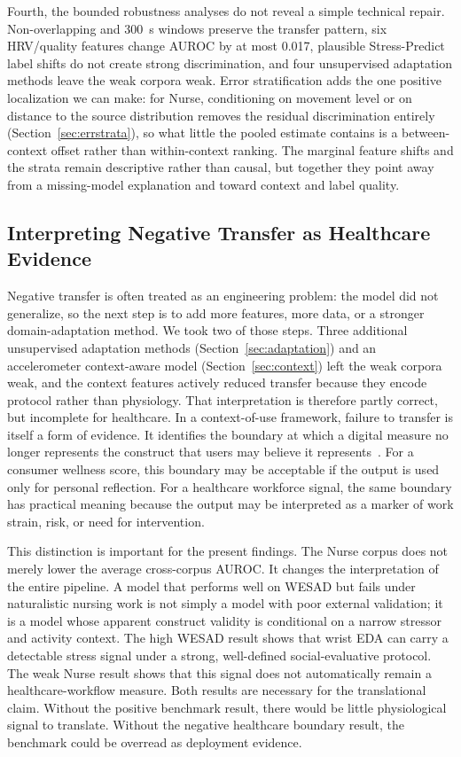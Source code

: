 \documentclass[healthcare,article,submit,moreauthors,pdftex]{Definitions/mdpi}
\begin{document}
Fourth, the bounded robustness analyses do not reveal a simple technical repair.
Non-overlapping and 300~s windows preserve the transfer pattern, six HRV/quality
features change AUROC by at most 0.017, plausible Stress-Predict label shifts do
not create strong discrimination, and four unsupervised adaptation methods leave
the weak corpora weak. Error stratification adds the one positive localization we
can make: for Nurse, conditioning on movement level or on distance to the source
distribution removes the residual discrimination entirely
(Section~\ref{sec:errstrata}), so what little the pooled estimate contains is a
between-context offset rather than within-context ranking. The marginal feature
shifts and the strata remain descriptive rather than causal, but together they
point away from a missing-model explanation and toward context and label quality.

\subsection{Interpreting Negative Transfer as Healthcare Evidence}

Negative transfer is often treated as an engineering problem: the model did not
generalize, so the next step is to add more features, more data, or a stronger
domain-adaptation method. We took two of those steps. Three additional
unsupervised adaptation methods (Section~\ref{sec:adaptation}) and an
accelerometer context-aware model (Section~\ref{sec:context}) left the weak
corpora weak, and the context features actively reduced transfer because they
encode protocol rather than physiology. That interpretation is therefore partly
correct, but incomplete for healthcare. In a context-of-use framework, failure to transfer is itself a
form of evidence. It identifies the boundary at which a digital measure no
longer represents the construct that users may believe it
represents~\cite{goldsack2020v3,manta2020digitalmeasures}. For a consumer
wellness score, this boundary may be acceptable if the output is used only for
personal reflection. For a healthcare workforce signal, the same boundary has
practical meaning because the output may be interpreted as a marker of work
strain, risk, or need for intervention.

This distinction is important for the present findings. The Nurse corpus does
not merely lower the average cross-corpus AUROC. It changes the interpretation of
the entire pipeline. A model that performs well on WESAD but fails under
naturalistic nursing work is not simply a model with poor external validation; it
is a model whose apparent construct validity is conditional on a narrow stressor
and activity context. The high WESAD result shows that wrist EDA can carry a
detectable stress signal under a strong, well-defined social-evaluative protocol.
The weak Nurse result shows that this signal does not automatically remain a
healthcare-workflow measure. Both results are necessary for the translational
claim. Without the positive benchmark result, there would be little physiological
signal to translate. Without the negative healthcare boundary result, the
benchmark could be overread as deployment evidence.
\end{document}
